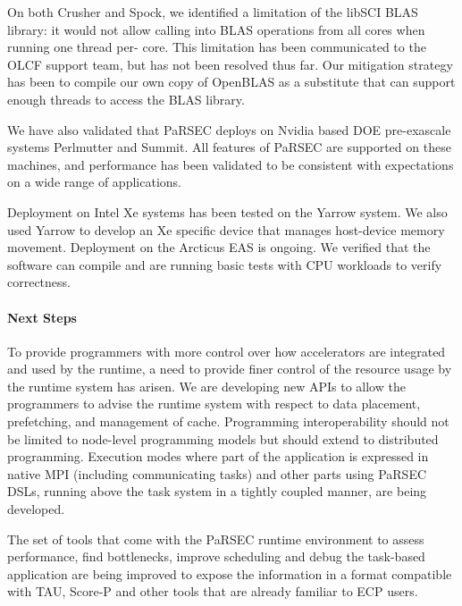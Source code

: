 On both Crusher and Spock, we identified a limitation of the libSCI BLAS library:
it would not allow calling into BLAS operations from all cores when running one thread per-
core. This limitation has been communicated to the OLCF support team, but has not been
resolved thus far. Our mitigation strategy has been to compile our own copy of OpenBLAS as 
a substitute that can support enough threads to access the BLAS library.

We have also validated that PaRSEC deploys on Nvidia based DOE pre-exascale systems 
Perlmutter and Summit. All features of PaRSEC are supported on these machines, 
and performance has been validated to be consistent with expectations on a wide range
of applications.

Deployment on Intel Xe systems has been tested on the Yarrow system. We
also used Yarrow to develop an Xe specific device that manages host-device
memory movement. Deployment on the Arcticus EAS is ongoing. We verified that
the software can compile and are running basic tests with CPU workloads to verify
correctness.

\paragraph{Next Steps}
To provide programmers with more control over how accelerators are
integrated and used by the runtime, a need to provide finer control of the
resource usage by the runtime system has arisen. We are developing new APIs to
allow the programmers to advise the runtime system with respect to data
placement, prefetching, and management of cache.
%
Programming interoperability should not be limited to node-level programming
models but should extend to distributed programming. Execution modes where part
of the application is expressed in native MPI (including communicating tasks)
and other parts using PaRSEC DSLs, running above the task system in a tightly
coupled manner, are being developed.


The set of tools that come with the PaRSEC runtime environment to
assess performance, find bottlenecks, improve scheduling and debug the
task-based application are being improved to expose the information
in a format compatible with TAU, Score-P and other
tools that are already familiar to ECP users.
